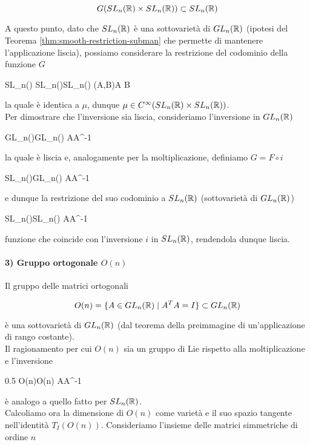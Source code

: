 \begin{equation}
	G(SL_{n}(\mathbb{R}) \times SL_{n}(\mathbb{R})) \subset SL_{n}(\mathbb{R})
\end{equation}

A questo punto, dato che $ SL_{n}(\mathbb{R}) $ è una sottovarietà di $ GL_{n}(\mathbb{R}) $ (ipotesi del Teorema \ref{thm:smooth-restriction-subman} che permette di mantenere l'applicazione liscia), possiamo considerare la restrizione del codominio della funzione $ G $

	{SL_{n}(\R) \times SL_{n}(\R)}{SL_{n}(\R)}
	{(A,B)}{A B}

la quale è identica a $ \mu $, dunque $ \mu \in C^{\infty}(SL_{n}(\mathbb{R}) \times SL_{n}(\mathbb{R})) $.\\
Per dimostrare che l'inversione sia liscia, consideriamo l'inversione in $ GL_{n}(\mathbb{R}) $

	{GL_{n}(\R)}{GL_{n}(\R)}
	{A}{A^{-1}}

la quale è liscia e, analogamente per la moltiplicazione, definiamo $ G = F \circ i $

	{SL_{n}(\R)}{GL_{n}(\R)}
	{A}{A^{-1}}

e dunque la restrizione del suo codominio a $ SL_{n}(\mathbb{R}) $ (sottovarietà di $ GL_{n}(\mathbb{R}) $)

	{SL_{n}(\R)}{SL_{n}(\R)}
	{A}{A^{-1}}

funzione che coincide con l'inversione $ i $ in $ SL_{n}(\mathbb{R}) $, rendendola dunque liscia.

\paragraph{3) Gruppo ortogonale $ O(n) $}

Il gruppo delle matrici ortogonali

\begin{equation}
	O(n) = \{ A \in GL_{n}(\mathbb{R}) \mid A^{T} A = I \} \subset GL_{n}(\mathbb{R})
\end{equation}

è una sottovarietà di $ GL_{n}(\mathbb{R}) $ (dal teorema della preimmagine di un'applicazione di rango costante).\\
Il ragionamento per cui $ O(n) $ sia un gruppo di Lie rispetto alla moltiplicazione e l'inversione

	{0.5}{%
				{O(n)}{O(n)}
				{A}{A^{-1}}
			}

è analogo a quello fatto per $ SL_{n}(\mathbb{R}) $.\\
Calcoliamo ora la dimensione di $ O(n) $ come varietà e il suo spazio tangente nell'identità $ T_{I}(O(n)) $. Consideriamo l'insieme delle matrici simmetriche di ordine $ n $

